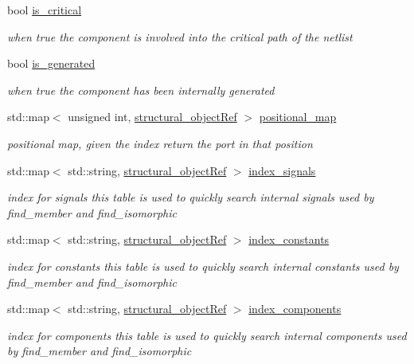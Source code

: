 \begin{DoxyCompactItemize}
bool \hyperlink{classmodule_a9bcfc24acd3410da8f3a70ec7c4d5799}{is\+\_\+critical}
\begin{DoxyCompactList}\small\item\em when true the component is involved into the critical path of the netlist \end{DoxyCompactList}\item 
bool \hyperlink{classmodule_a0ef4678f8b3d4e9e15d97b7b6664a540}{is\+\_\+generated}
\begin{DoxyCompactList}\small\item\em when true the component has been internally generated \end{DoxyCompactList}\item 
std\+::map$<$ unsigned int, \hyperlink{structural__objects_8hpp_a8ea5f8cc50ab8f4c31e2751074ff60b2}{structural\+\_\+object\+Ref} $>$ \hyperlink{classmodule_a40509accacd208100d95e56667c94247}{positional\+\_\+map}
\begin{DoxyCompactList}\small\item\em positional map, given the index return the port in that position \end{DoxyCompactList}\item 
std\+::map$<$ std\+::string, \hyperlink{structural__objects_8hpp_a8ea5f8cc50ab8f4c31e2751074ff60b2}{structural\+\_\+object\+Ref} $>$ \hyperlink{classmodule_af76f32a88cc575505605cc7bef4c4d49}{index\+\_\+signals}
\begin{DoxyCompactList}\small\item\em index for signals this table is used to quickly search internal signals used by find\+\_\+member and find\+\_\+isomorphic \end{DoxyCompactList}\item 
std\+::map$<$ std\+::string, \hyperlink{structural__objects_8hpp_a8ea5f8cc50ab8f4c31e2751074ff60b2}{structural\+\_\+object\+Ref} $>$ \hyperlink{classmodule_a7e195316824998c2a86b508ab4161a49}{index\+\_\+constants}
\begin{DoxyCompactList}\small\item\em index for constants this table is used to quickly search internal constants used by find\+\_\+member and find\+\_\+isomorphic \end{DoxyCompactList}\item 
std\+::map$<$ std\+::string, \hyperlink{structural__objects_8hpp_a8ea5f8cc50ab8f4c31e2751074ff60b2}{structural\+\_\+object\+Ref} $>$ \hyperlink{classmodule_aaf6c17fc710da7415f1a8d566e7f9363}{index\+\_\+components}
\begin{DoxyCompactList}\small\item\em index for components this table is used to quickly search internal components used by find\+\_\+member and find\+\_\+isomorphic \end{DoxyCompactList}\item 

\end{DoxyCompactItemize}
